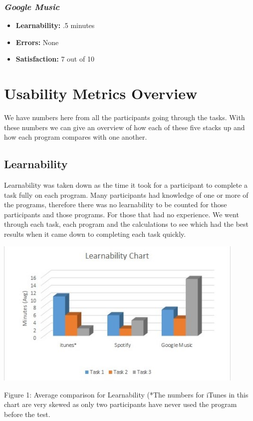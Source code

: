 \documentclass{article}
\begin{document}
{\begin{multicols}{2}
\subsubsection{\it Google Music}
\begin{itemize}
\item {\bf Learnability:} .5 minutes
	\item {\bf Errors:} None
	\item {\bf Satisfaction:} 7 out of 10 
\end{itemize}
\end{multicols}

\section{Usability Metrics Overview}
We have numbers here from all the participants going through the tasks. With these numbers we can give an overview of how each of these five stacks up and how each program compares with one another.

\subsection{Learnability}
Learnability was taken down as the time it took for a participant to complete a task fully on each program. Many participants had knowledge of one or more of the programs, therefore there was no learnability to be counted for those participants and those programs. For those that had no experience. We went through each task, each program and the calculations to see which had the best results when it came down to completing each task quickly.

\begin{center}
\includegraphics[width=120mm]{Learnability.jpg}
\end{center}
\begin{center}
Figure 1: Average comparison for Learnability (*The numbers for iTunes in this chart are very skewed as only two participants have never used the program before the test.
\end{center}

}
\end{document}
